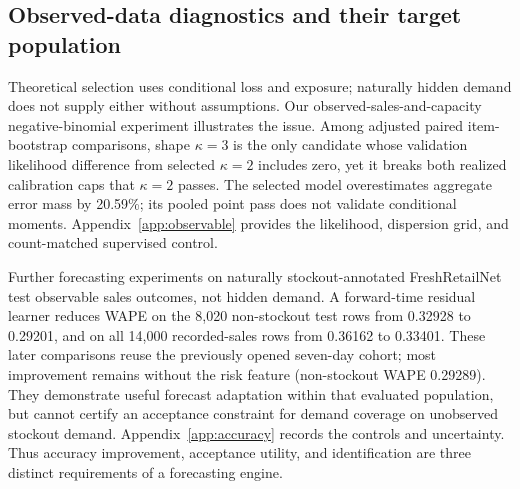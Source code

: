 \subsection{Observed-data diagnostics and their target population}
\label{app:natural-diagnostics}
Theoretical selection uses conditional loss and exposure; naturally hidden demand does not supply either without assumptions. Our observed-sales-and-capacity negative-binomial experiment illustrates the issue. Among adjusted paired item-bootstrap comparisons, shape $\kappa=3$ is the only candidate whose validation likelihood difference from selected $\kappa=2$ includes zero, yet it breaks both realized calibration caps that $\kappa=2$ passes. The selected model overestimates aggregate error mass by 20.59\%; its pooled point pass does not validate conditional moments. Appendix~\ref{app:observable} provides the likelihood, dispersion grid, and count-matched supervised control.

Further forecasting experiments on naturally stockout-annotated FreshRetailNet test observable sales outcomes, not hidden demand. A forward-time residual learner reduces WAPE on the 8,020 non-stockout test rows from 0.32928 to 0.29201, and on all 14,000 recorded-sales rows from 0.36162 to 0.33401. These later comparisons reuse the previously opened seven-day cohort; most improvement remains without the risk feature (non-stockout WAPE 0.29289). They demonstrate useful forecast adaptation within that evaluated population, but cannot certify an acceptance constraint for demand coverage on unobserved stockout demand. Appendix~\ref{app:accuracy} records the controls and uncertainty. Thus accuracy improvement, acceptance utility, and identification are three distinct requirements of a forecasting engine.

